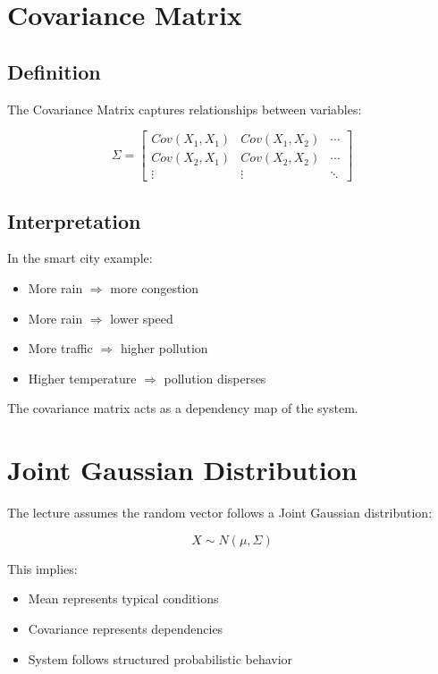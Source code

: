 \documentclass[11pt]{article}
\begin{document}
\section{Covariance Matrix}

\subsection{Definition}

The Covariance Matrix captures relationships between variables:

\[
\Sigma =
\begin{bmatrix}
Cov(X_1,X_1) & Cov(X_1,X_2) & \cdots \\
Cov(X_2,X_1) & Cov(X_2,X_2) & \cdots \\
\vdots & \vdots & \ddots
\end{bmatrix}
\]

\subsection{Interpretation}

In the smart city example:

\begin{itemize}
\item More rain $\Rightarrow$ more congestion
\item More rain $\Rightarrow$ lower speed
\item More traffic $\Rightarrow$ higher pollution
\item Higher temperature $\Rightarrow$ pollution disperses
\end{itemize}

The covariance matrix acts as a dependency map of the system.

\section{Joint Gaussian Distribution}

The lecture assumes the random vector follows a Joint Gaussian distribution:

\[
X \sim N(\mu, \Sigma)
\]

This implies:

\begin{itemize}
\item Mean represents typical conditions
\item Covariance represents dependencies
\item System follows structured probabilistic behavior
\end{itemize}
\end{document}
